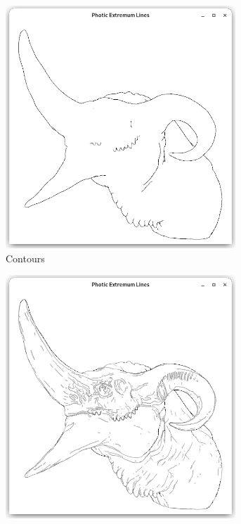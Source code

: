 \documentclass[9pt,fleqn,twoside,twocolumn]{stdglobal}
\begin{document}
\begin{figure}
\begin{subfigure}[b]{0.24\textwidth}
        \includegraphics[width=0.95\textwidth,trim={15px 15 15 50},clip]{images/dragon-head-contours.png}
        \caption{Contours}
      \end{subfigure}%
      \hfill%
      \begin{subfigure}[b]{0.24\textwidth}
        \centering
        \includegraphics[width=0.95\textwidth,trim={15px 15 15 50},clip]{images/dragon-head-contour-pel-shader.png}

\end{subfigure}
\end{figure}
\end{document}

